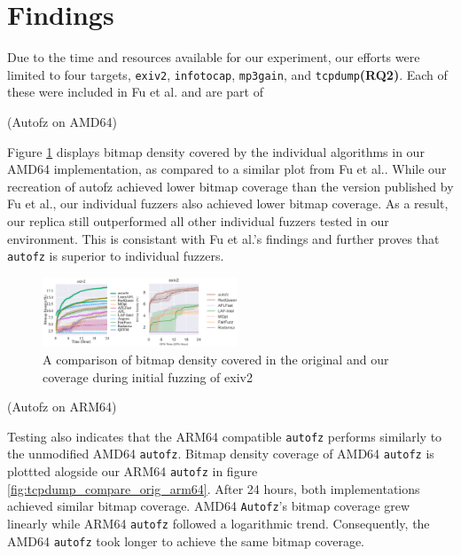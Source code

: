 \section{Findings}

Due to the time and resources available for our experiment, our efforts were limited 
to four targets, \texttt{exiv2}, \texttt{infotocap}, \texttt{mp3gain}, and 
\texttt{tcpdump}\textbf{(RQ2)}. Each of these were included in Fu et al.\cite{fu_autofz_2023} 
and are part of

\substection(Autofz on AMD64)

Figure \ref{fig:exiv2_compare_orig_arm64} displays bitmap density covered by the individual algorithms in our AMD64 implementation, 
as compared to a similar plot from Fu et al.\cite{fu_autofz_2023}. While our recreation of autofz achieved lower bitmap coverage than 
the version published by Fu et al., our individual fuzzers also achieved lower bitmap coverage. As a result, our replica still 
outperformed all other individual fuzzers tested in our environment. This is consistant
with Fu et al.'s findings and further proves that \texttt{autofz} is superior to individual fuzzers.

\begin{figure}
    \includegraphics[width=0.52\textwidth]{figs/exiv2_compare_orig_arm64.png}
    \centering
    \caption{A comparison of bitmap density covered in the original\cite{fu_autofz_2023} and our 
    coverage during initial fuzzing of exiv2}
    \label{fig:exiv2_compare_orig_arm64}
\end{figure}

\substection(Autofz on ARM64)

Testing also indicates that the ARM64 compatible \texttt{autofz} performs similarly to the unmodified AMD64 \texttt{autofz}. 
Bitmap density coverage of AMD64 \texttt{autofz} is plottted alogside our ARM64 \texttt{autofz} in figure 
\ref{fig:tcpdump_compare_orig_arm64}. After 24 hours, both implementations achieved similar bitmap coverage.
AMD64 \texttt{Autofz}'s bitmap coverage grew linearly while ARM64 \texttt{autofz} followed a logarithmic trend. Consequently, 
the AMD64 \texttt{autofz} took longer to achieve the same bitmap coverage. 

